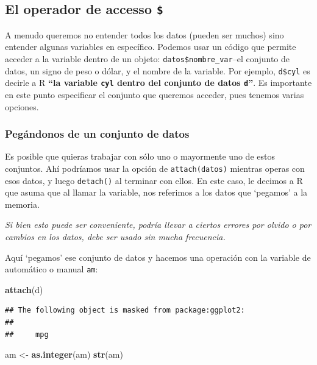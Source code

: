 \documentclass[
]{article}
\newenvironment{Shaded}{\begin{snugshade}}{\end{snugshade}}
\newcommand{\FunctionTok}[1]{\textcolor[rgb]{0.13,0.29,0.53}{\textbf{#1}}}
\newcommand{\NormalTok}[1]{#1}
\newcommand{\OtherTok}[1]{\textcolor[rgb]{0.56,0.35,0.01}{#1}}
\begin{document}
\subsection{\texorpdfstring{El operador de accesso
\texttt{\$}}{El operador de accesso \$}}\label{el-operador-de-accesso}

A menudo queremos no entender todos los datos (pueden ser muchos) sino
entender algunas variables en específico. Podemos usar un código que
permite acceder a la variable dentro de un objeto:
\texttt{datos\$nombre\_var}--el conjunto de datos, un signo de peso o
dólar, y el nombre de la variable. Por ejemplo, \texttt{d\$cyl} es
decirle a R \textbf{``la variable \texttt{cyl} dentro del conjunto de
datos \texttt{d}''}. Es importante en este punto especificar el conjunto
que queremos acceder, pues tenemos varias opciones.

\subsubsection{Pegándonos de un conjunto de
datos}\label{peguxe1ndonos-de-un-conjunto-de-datos}

Es posible que quieras trabajar con sólo uno o mayormente uno de estos
conjuntos. Ahí podríamos usar la opción de \texttt{attach(datos)}
mientras operas con esos datos, y luego \texttt{detach()} al terminar
con ellos. En este caso, le decimos a R que asuma que al llamar la
variable, nos referimos a los datos que `pegamos' a la memoria.

\emph{Si bien esto puede ser conveniente, podría llevar a ciertos
errores por olvido o por cambios en los datos, debe ser usado sin mucha
frecuencia.}

Aquí `pegamos' ese conjunto de datos y hacemos una operación con la
variable de automático o manual \texttt{am}:

\begin{Shaded}
\begin{Highlighting}[]
\FunctionTok{attach}\NormalTok{(d)}
\end{Highlighting}
\end{Shaded}

\begin{verbatim}
## The following object is masked from package:ggplot2:
## 
##     mpg
\end{verbatim}

\begin{Shaded}
\begin{Highlighting}[]
\NormalTok{am }\OtherTok{\textless{}{-}} \FunctionTok{as.integer}\NormalTok{(am)}
\FunctionTok{str}\NormalTok{(am)}
\end{Highlighting}
\end{Shaded}
\end{document}
